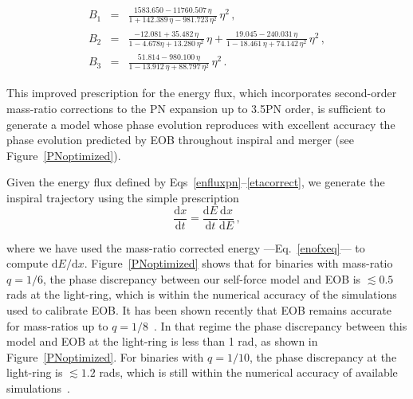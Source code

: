 \begin{eqnarray}
\label{B1}
B_1&=& \frac{1583.650 - 11760.507\, \eta}{1 + 142.389\, \eta - 981.723\, \eta^2}\,\eta^2\,,\\
\label{B2}
B_2 &=& \frac{-12.081 + 35.482\, \eta}{1 - 4.678 \eta + 13.280\, \eta^2}\,\eta +  \frac{19.045 - 240.031\, \eta}{1 - 18.461\, \eta + 74.142\, \eta^2}\,\eta^2\,,\\
\label{B3}
 B_3 &=& \frac{51.814 - 980.100\, \eta}{1 - 13.912\, \eta + 88.797\, \eta^2}\,\eta^2\,.
 \label{new_coef}
 \end{eqnarray}



This improved prescription for the energy flux, which incorporates second-order mass-ratio corrections to the PN expansion up to 3.5PN order, is sufficient to generate a model whose phase evolution reproduces with excellent accuracy the phase evolution predicted by EOB throughout inspiral and merger (see Figure~\ref{PNoptimized}).

Given the energy flux defined by Eqs~\eqref{enfluxpn}--\eqref{etacorrect}, we generate the inspiral trajectory using the simple prescription 
\begin{equation}
\frac{{\mathrm{d}}x}{{\mathrm{d}}t}= \frac{{\mathrm{d}} E}{{\mathrm{d}} t}\frac{{\mathrm{d}} x}{{\mathrm{d}}E}\,,
\label{radev}
\end{equation}

\noindent where we have used the mass-ratio corrected energy ---Eq.~\eqref{enofxeq}--- to compute \({\mathrm{d}}E/{\mathrm{d}}x\). Figure~\ref{PNoptimized} shows that for binaries with mass-ratio \(q=1/6\), the phase discrepancy between our self-force model and EOB is \(\lesssim 0.5\) rads at the light-ring, which is within the numerical accuracy of the simulations used to calibrate EOB. It has been shown recently that EOB remains accurate for mass-ratios up to \(q=1/8\)~\cite{Pan:2013}. In that regime the phase discrepancy between this model and EOB at the light-ring is less than 1 rad, as shown in Figure~\ref{PNoptimized}. For binaries with \(q=1/10\), the phase discrepancy at the light-ring is \(\lesssim 1.2\) rads, which is still within the numerical accuracy of available simulations~\cite{carlosI, carlosII}. 

